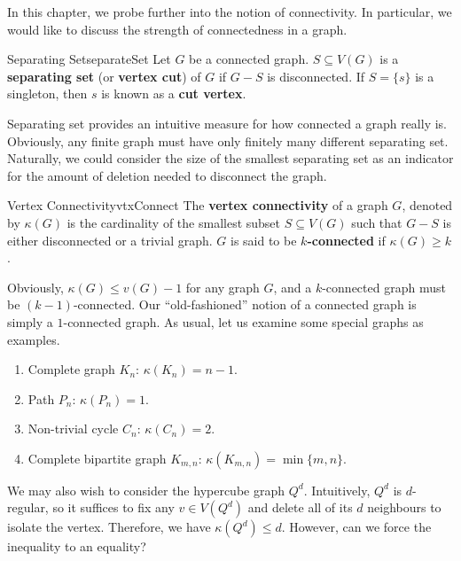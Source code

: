 \documentclass[math]{amznotes}
\theoremstyle{remark}
\begin{document}
In this chapter, we probe further into the notion of connectivity. In particular, we would like to discuss the strength of connectedness in a graph.
\begin{dfnbox}{Separating Set}{separateSet}
    Let $G$ be a connected graph. $S \subseteq V(G)$ is a {\color{red} \textbf{separating set}} (or {\color{red} \textbf{vertex cut}}) of $G$ if $G - S$ is disconnected. If $S = \{s\}$ is a singleton, then $s$ is known as a {\color{red} \textbf{cut vertex}}.
\end{dfnbox}
Separating set provides an intuitive measure for how connected a graph really is. Obviously, any finite graph must have only finitely many different separating set. Naturally, we could consider the size of the smallest separating set as an indicator for the amount of deletion needed to disconnect the graph.
\begin{dfnbox}{Vertex Connectivity}{vtxConnect}
    The {\color{red} \textbf{vertex connectivity}} of a graph $G$, denoted by $\kappa(G)$ is the cardinality of the smallest subset $S \subseteq V(G)$ such that $G - S$ is either disconnected or a trivial graph. $G$ is said to be {\color{red} \textbf{$k$-connected}} if $\kappa(G) \geq k$.
\end{dfnbox}
Obviously, $\kappa(G) \leq v(G) - 1$ for any graph $G$, and a $k$-connected graph must be $(k - 1)$-connected. Our ``old-fashioned'' notion of a connected graph is simply a $1$-connected graph. As usual, let us examine some special graphs as examples.
\begin{enumerate}
    \item Complete graph $K_n$: $\kappa(K_n) = n - 1$.
    \item Path $P_n$: $\kappa(P_n) = 1$.
    \item Non-trivial cycle $C_n$: $\kappa(C_n) = 2$.
    \item Complete bipartite graph $K_{m, n}$: $\kappa(K_{m, n}) = \min\{m, n\}$.
\end{enumerate}
We may also wish to consider the hypercube graph $Q^d$. Intuitively, $Q^d$ is $d$-regular, so it suffices to fix any $v \in V\left(Q^d\right)$ and delete all of its $d$ neighbours to isolate the vertex. Therefore, we have $\kappa\left(Q^d\right) \leq d$. However, can we force the inequality to an equality?
\end{document}
